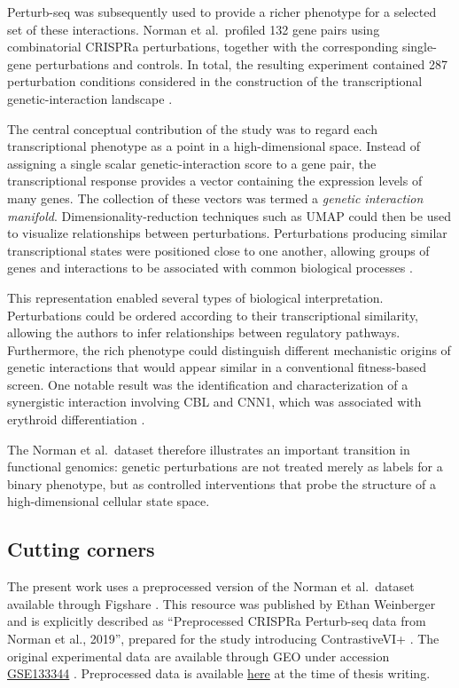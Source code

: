 \documentclass[11pt,a4paper]{article}
\begin{document}
Perturb-seq was subsequently used to provide a richer phenotype for a selected
set of these interactions. Norman et al.\ profiled 132 gene pairs using
combinatorial CRISPRa perturbations, together with the corresponding
single-gene perturbations and controls. In total, the resulting experiment
contained 287 perturbation conditions considered in the construction of the
transcriptional genetic-interaction landscape \cite{norman2019}.

The central conceptual contribution of the study was to regard each
transcriptional phenotype as a point in a high-dimensional space. Instead of
assigning a single scalar genetic-interaction score to a gene pair, the
transcriptional response provides a vector containing the expression levels of
many genes. The collection of these vectors was termed a \textit{genetic
	interaction manifold}. Dimensionality-reduction techniques such as UMAP could
then be used to visualize relationships between perturbations. Perturbations
producing similar transcriptional states were positioned close to one another,
allowing groups of genes and interactions to be associated with common
biological processes \cite{norman2019}.

This representation enabled several types of biological interpretation.
Perturbations could be ordered according to their transcriptional similarity,
allowing the authors to infer relationships between regulatory pathways.
Furthermore, the rich phenotype could distinguish different mechanistic
origins of genetic interactions that would appear similar in a conventional
fitness-based screen. One notable result was the identification and
characterization of a synergistic interaction involving CBL and
CNN1, which was associated with erythroid differentiation
\cite{norman2019}.

The Norman et al.\ dataset therefore illustrates an important transition in
functional genomics: genetic perturbations are not treated merely as labels
for a binary phenotype, but as controlled interventions that probe the
structure of a high-dimensional cellular state space.

\subsection{Cutting corners}

The present work uses a preprocessed version of the Norman et al.\ dataset
available through Figshare \cite{weinberger2024figshare}. This resource was
published by Ethan Weinberger and is explicitly described as
``Preprocessed CRISPRa Perturb-seq data from Norman et al., 2019'', prepared
for the study introducing ContrastiveVI+ \cite{weinberger2024}. The original
experimental data are available through GEO under accession \href{https://www.ncbi.nlm.nih.gov/geo/query/acc.cgi?acc=GSE133344}{GSE133344}
\cite{norman2019geo}. Preprocessed data is available \href{https://figshare.com/articles/dataset/Norman_et_al_2019_Perturb-seq/27766323?file=50533869}{here} at the time of thesis writing.
\end{document}
